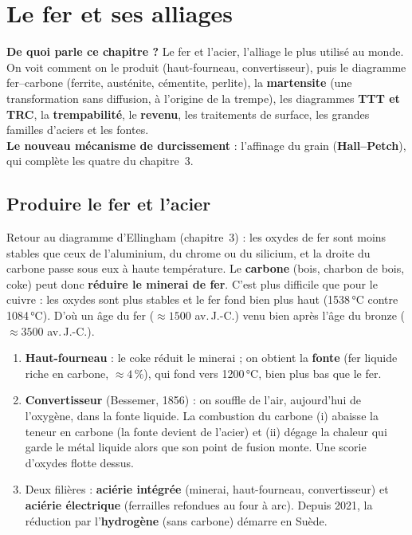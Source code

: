 \chapter{Le fer et ses alliages}

\begin{rembox}[title=En bref]
\textbf{De quoi parle ce chapitre ?} Le fer et l'acier, l'alliage le plus utilisé au monde. On
voit comment on le produit (haut-fourneau, convertisseur), puis le diagramme fer--carbone
(ferrite, austénite, cémentite, perlite), la \textbf{martensite} (une transformation sans
diffusion, à l'origine de la trempe), les diagrammes \textbf{TTT et TRC}, la
\textbf{trempabilité}, le \textbf{revenu}, les traitements de surface, les grandes familles
d'aciers et les fontes. \\
\textbf{Le nouveau mécanisme de durcissement} : l'affinage du grain (\textbf{Hall--Petch}), qui
complète les quatre du chapitre~3.
\end{rembox}

\section{Produire le fer et l'acier}

Retour au diagramme d'Ellingham (chapitre~3) : les oxydes de fer sont moins stables que ceux de
l'aluminium, du chrome ou du silicium, et la droite du carbone passe sous eux à haute
température. Le \textbf{carbone} (bois, charbon de bois, coke) peut donc \textbf{réduire le
minerai de fer}. C'est plus difficile que pour le cuivre : les oxydes sont plus stables et le fer
fond bien plus haut (1538\,°C contre 1084\,°C). D'où un âge du fer ($\approx 1500$ av.\,J.-C.)
venu bien après l'âge du bronze ($\approx 3500$ av.\,J.-C.).

\begin{propbox}[title={Du minerai à l'acier}]
\begin{enumerate}
  \item \textbf{Haut-fourneau} : le coke réduit le minerai ; on obtient la \textbf{fonte} (fer
        liquide riche en carbone, $\approx 4\,\%$), qui fond vers 1200\,°C, bien plus bas que le
        fer.
  \item \textbf{Convertisseur} (Bessemer, 1856) : on souffle de l'air, aujourd'hui de
        l'oxygène, dans la fonte liquide. La combustion du carbone (i) abaisse la teneur en
        carbone (la fonte devient de l'acier) et (ii) dégage la chaleur qui garde le métal
        liquide alors que son point de fusion monte. Une scorie d'oxydes flotte dessus.
  \item Deux filières : \textbf{aciérie intégrée} (minerai, haut-fourneau, convertisseur) et
        \textbf{aciérie électrique} (ferrailles refondues au four à arc). Depuis 2021, la
        réduction par l'\textbf{hydrogène} (sans carbone) démarre en Suède.
\end{enumerate}
\end{propbox}

